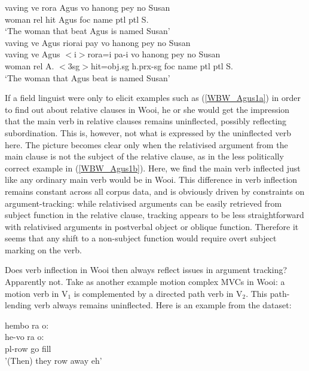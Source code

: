 \pex 
\a \label{WBW_Agus1a}
\gll vaving ve rora Agus vo hanong pey no Susan \\
woman \acs{rel} hit Agus \acs{foc} name \acs{ptl} \acs{ptl} S. \\
\glft `The woman that beat Agus is named Susan' \\ 
\z
\a \label{WBW_Agus1b}
\gll vaving ve Agus riorai pay vo hanong pey no Susan \\ 
vaving ve Agus $<$i$>$rora=i pa-i vo hanong pey no Susan \\
\glc woman \acs{rel} A. $<$3\acs{sg}$>$hit=\acs{obj}.\acs{sg} \acs{h}.\acs{prx}-\acs{sg} \acs{foc} name \acs{ptl} \acs{ptl} S. \\
\glft `The woman that Agus beat is named Susan' \\ 
\z
\xe

If a field linguist were only to elicit examples such as (\ref{WBW_Agus1a}) in order to find out about relative clauses in Wooi, he or she would get the impression that the main verb in relative clauses remains uninflected, possibly reflecting subordination. This is, however, not what is expressed by the uninflected verb here. The picture becomes clear only when the relativised argument from the main clause is not the subject of the relative clause, as in the less politically correct example in (\ref{WBW_Agus1b}). Here, we find the main verb inflected just like any ordinary main verb would be in Wooi. This difference in verb inflection remains constant across all corpus data, and is obviously driven by constraints on argument-tracking: while relativised arguments can be easily retrieved from subject function in the relative clause, tracking appears to be less straightforward with relativised arguments in postverbal object or oblique function. Therefore it seems that any shift to a non-subject function would require overt subject marking on the verb.

Does verb inflection in Wooi then always reflect issues in argument tracking? Apparently not. Take as another example motion complex MVCs in Wooi: a motion verb in V$_1$ is complemented by a directed path verb in V$_2$. This path-lending verb always remains uninflected. Here is an example from the dataset:

\ea \label{}
\gll hembo ra o: \\
he-vo ra o: \\
\acs{pl}-row go \acs{fill} \\
\glft '(Then) they row away eh' \\ 
\z
\xe

